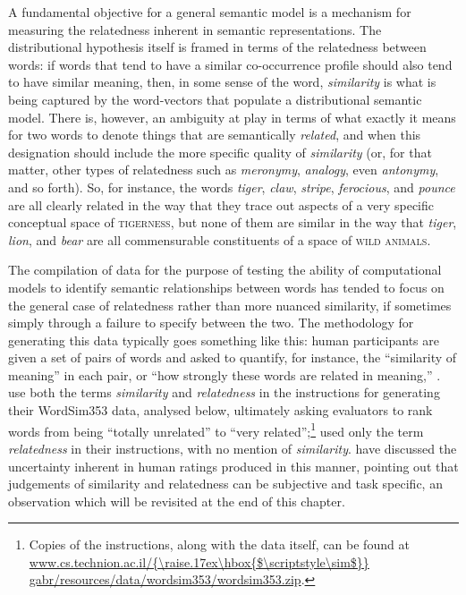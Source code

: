 A fundamental objective for a general semantic model is a mechanism for measuring the relatedness inherent in semantic representations.  The distributional hypothesis itself is framed in terms of the relatedness between words: if words that tend to have a similar co-occurrence profile should also tend to have similar meaning, then, in some sense of the word, \emph{similarity} is what is being captured by the word-vectors that populate a distributional semantic model.  There is, however, an ambiguity at play in terms of what exactly it means for two words to denote things that are semantically \emph{related}, and when this designation should include the more specific quality of \emph{similarity} (or, for that matter, other types of relatedness such as \emph{meronymy}, \emph{analogy}, even \emph{antonymy}, and so forth).  So, for instance, the words \emph{tiger}, \emph{claw}, \emph{stripe}, \emph{ferocious}, and \emph{pounce} are all clearly related in the way that they trace out aspects of a very specific conceptual space of \textsc{tigerness}, but none of them are similar in the way that \emph{tiger}, \emph{lion}, and \emph{bear} are all commensurable constituents of a space of \textsc{wild animals}.

The compilation of data for the purpose of testing the ability of computational models to identify semantic relationships between words has tended to focus on the general case of relatedness rather than more nuanced similarity, if sometimes simply through a failure to specify between the two.  The methodology for generating this data typically goes something like this: human participants are given a set of pairs of words and asked to quantify, for instance, the ``similarity of meaning'' \citep[][p. 628]{RubensteinEA1965} in each pair, or ``how strongly these words are related in meaning,'' \citep[][p. 124]{YangEA2006}.  \cite{FinkelsteinEA2002} use both the terms \emph{similarity} and \emph{relatedness} in the instructions for generating their WordSim353 data, analysed below, ultimately asking evaluators to rank words from being ``totally unrelated'' to ``very related'';\footnote{Copies of the instructions, along with the data itself, can be found at \url{www.cs.technion.ac.il/{\raise.17ex\hbox{$\scriptstyle\sim$}} gabr/resources/data/wordsim353/wordsim353.zip}.} \cite{BruniEA2012} used only the term \emph{relatedness} in their instructions, with no mention of \emph{similarity}.  \cite{FaruquiEA2016} have discussed the uncertainty inherent in human ratings produced in this manner, pointing out that judgements of similarity and relatedness can be subjective and task specific, an observation which will be revisited at the end of this chapter.

